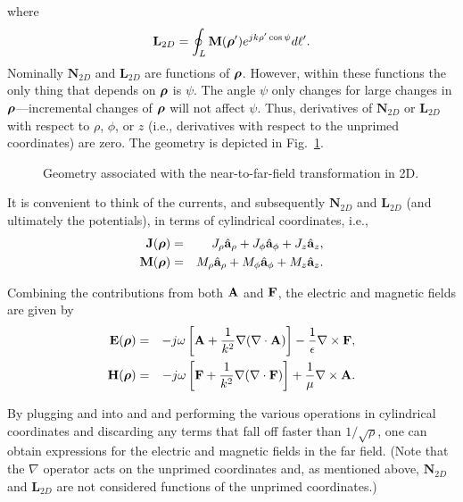 where
\begin{equation}
  \mathbf{L}_{2D} = 
     \oint_L \mathbf{M}(\boldsymbol{\rho}') e^{jk\rho'\cos\psi} d\ell'.
\end{equation}
Nominally $\mathbf{N}_{2D}$ and $\mathbf{L}_{2D}$ are functions of
$\boldsymbol{\rho}$.  However, within these functions the only thing that
depends on $\boldsymbol{\rho}$ is $\psi$.  The angle $\psi$ only changes for
large changes in $\boldsymbol{\rho}$---incremental changes of $\boldsymbol{\rho}$ will not
affect $\psi$.  Thus, derivatives of $\mathbf{N}_{2D}$ or
$\mathbf{L}_{2D}$ with respect to $\rho$, $\phi$, or $z$ (i.e.,
derivatives with respect to the unprimed coordinates) are zero.
The geometry is depicted in Fig.\ \ref{fig:ntffGeomTwoD}.

\begin{figure}
  \begin{center}
  \end{center}
  \caption{Geometry associated with the near-to-far-field
  transformation in 2D.}  \label{fig:ntffGeomTwoD}
\end{figure}


It is convenient to think of the currents, and subsequently
$\mathbf{N}_{2D}$ and $\mathbf{L}_{2D}$ (and ultimately the
potentials), in terms of cylindrical coordinates, i.e.,
\begin{eqnarray}
  \mathbf{J}(\boldsymbol{\rho}) &=& J_\rho \hat{\mathbf{a}}_{\rho} + 
                        J_\phi \hat{\mathbf{a}}_{\phi} + 
                        J_z \hat{\mathbf{a}}_{z}, \\
  \mathbf{M}(\boldsymbol{\rho}) &=& M_\rho \hat{\mathbf{a}}_{\rho} + 
                        M_\phi \hat{\mathbf{a}}_{\phi} + 
                        M_z \hat{\mathbf{a}}_{z}.
\end{eqnarray}

Combining the contributions from both $\mathbf{A}$ and $\mathbf{F}$, the
electric and magnetic fields are given by
\begin{eqnarray}
  \mathbf{E}(\boldsymbol{\rho}) &=&
    -j\omega\left[\mathbf{A} +
                  \frac{1}{k^2}\nabla(\nabla\cdot\mathbf{A})\right]
    -\frac{1}{\epsilon}\nabla\times\mathbf{F}, \label{eq:eFieldFar}
  \\
  \mathbf{H}(\boldsymbol{\rho}) &=&
    -j\omega\left[\mathbf{F} +
                  \frac{1}{k^2}\nabla(\nabla\cdot\mathbf{F})\right]
    +\frac{1}{\mu}\nabla\times\mathbf{A}. \label{eq:hFieldFar}
\end{eqnarray}

By plugging  and  into
 and  and performing the various
operations in cylindrical coordinates and discarding any terms that
fall off faster than $1/\sqrt{\rho}$, one can obtain expressions for
the electric and magnetic fields in the far field.  (Note that the
$\nabla$ operator acts on the unprimed coordinates and, as mentioned
above, $\mathbf{N}_{2D}$ and $\mathbf{L}_{2D}$ are not considered
functions of the unprimed coordinates.)

